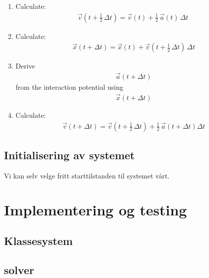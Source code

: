 \documentclass[11pt, twocolumn]{article}
\begin{document}
\begin{enumerate}
\item Calculate: \begin{align*}
\vec{v}\left(t + \tfrac12\,\Delta t\right) = \vec{v}(t) + \tfrac12\,\vec{a}(t)\,\Delta t\ 
\end{align*}


\item Calculate: \begin{align*} \vec{x}(t + \Delta t) = \vec{x}(t) + \vec{v}\left(t + \tfrac12\,\Delta t\right)\, \Delta t \end{align*}


\item Derive \begin{align*} \vec{a}(t + \Delta t) 
\end{align*} from the interaction potential using \begin{align*} \vec{x}(t + \Delta t) \end{align*}


\item Calculate: \begin{align*} \vec{v}(t + \Delta t) = \vec{v}\left(t + \tfrac12\,\Delta t\right) + \tfrac12\,\vec{a}(t + \Delta t)\Delta t \end{align*}
\end{enumerate}

\subsection{Initialisering av systemet}
Vi kan selv velge fritt starttilstanden til systemet vårt.


\section{Implementering og testing}
\subsection{Klassesystem}
\subsection{solver}




\printbibliography
\end{document}
